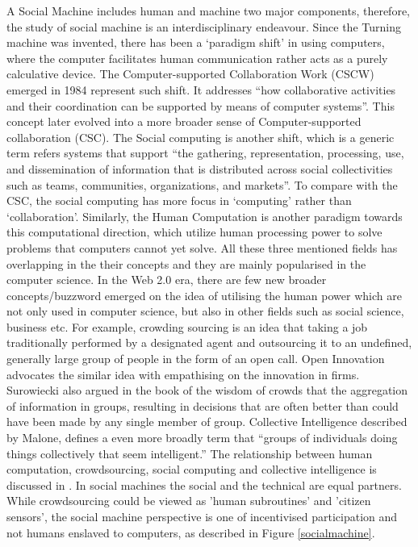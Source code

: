 \documentclass{sig-alternate}
\begin{document}
A Social Machine includes human and machine two major components, therefore, the study of social machine is an interdisciplinary endeavour. Since the Turning machine was invented, there has been a `paradigm shift' \cite{kuhn1996structure} in using computers, where the computer facilitates human communication rather acts as a purely calculative device. The Computer-supported Collaboration Work (CSCW) emerged in 1984 represent such shift. It addresses ``how collaborative activities and their coordination can be supported by means of computer systems''. This concept later evolved into a more broader sense of  Computer-supported collaboration (CSC). The Social computing \cite{parameswaran2007research} is another shift, which is a generic term refers systems that support ``the gathering, representation, processing, use, and dissemination of information that is distributed across social collectivities such as teams, communities, organizations, and markets''. To compare with the CSC, the social computing has more focus in `computing' rather than `collaboration'. Similarly, the Human Computation \cite{von2009human} is another paradigm towards this computational direction, which utilize human processing power to solve problems that computers cannot yet solve. All these three mentioned fields has overlapping in the their concepts and they are mainly popularised in the computer science. In the Web 2.0 era, there are few new broader concepts/buzzword emerged on the idea of utilising the human power which are not only used in computer science, but also in other fields such as social science, business etc. For example, crowding sourcing \cite{howe2006crowdsourcing} is an idea that taking a job traditionally performed by a designated agent and outsourcing it to an undefined, generally large group of people in the form of an open call. Open Innovation \cite{chesbrough2008open} advocates the similar idea with empathising on the innovation in firms. Surowiecki also argued in the book of the wisdom of crowds that the aggregation of information in groups, resulting in decisions that are often better than could have been made by any single member of group. Collective Intelligence described by Malone, defines a even more broadly term that ``groups of individuals doing things collectively that seem intelligent.'' 
The relationship between human computation, crowdsourcing, social computing and collective intelligence is discussed in . 
In  social machines  the  social and  the  technical are equal  partners. While  crowdsourcing  could  be  viewed  as  'human  subroutines'  and  'citizen  sensors',  the social machine perspective is one of incentivised participation and not humans enslaved to computers, as described in Figure \ref{socialmachine}.
\end{document}
